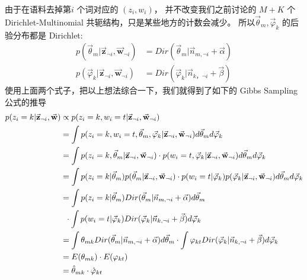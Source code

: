 由于在语料去掉第$i$ 个词对应的 $(z_i, w_i)$，
并不改变我们之前讨论的 $M+K$ 个 Dirichlet-Multinomial 共轭结构，只是某些地方的计数会减少。
所以$\vec{\theta}_m, \vec{\varphi}_k$ 的后验分布都是 Dirichlet:
\begin{align*}
p(\vec{\theta}_m|\vec{\mathbf{z}}_{\neg i}, \vec{\mathbf{w}}_{\neg i})
&= Dir(\vec{\theta}_m| \vec{n}_{m,\neg i} + \vec{\alpha}) \\
p(\vec{\varphi}_k|\vec{\mathbf{z}}_{\neg i}, \vec{\mathbf{w}}_{\neg i})
&=  Dir( \vec{\varphi}_k| \vec{n}_{k，\neg i} + \vec{\beta})
\end{align*}
使用上面两个式子，把以上想法综合一下，我们就得到了如下的 Gibbs Sampling 公式的推导
\begin{align*}
p(z_i = k|\vec{\mathbf{z}}_{\neg i}, \vec{\mathbf{w}}) & \propto
p(z_i = k, w_i = t |\vec{\mathbf{z}}_{\neg i}, \vec{\mathbf{w}}_{\neg i}) \\
&= \int p(z_i = k, w_i = t, \vec{\theta}_m,\vec{\varphi}_k |
   \vec{\mathbf{z}}_{\neg i}, \vec{\mathbf{w}}_{\neg i}) d \vec{\theta}_m d \vec{\varphi}_k \\
&= \int p(z_i = k, \vec{\theta}_m|\vec{\mathbf{z}}_{\neg i}, \vec{\mathbf{w}}_{\neg i})
   \cdot p(w_i = t, \vec{\varphi}_k | \vec{\mathbf{z}}_{\neg i}, \vec{\mathbf{w}}_{\neg i})
   d \vec{\theta}_m d \vec{\varphi}_k   \\
&= \int p(z_i = k |\vec{\theta}_m) p(\vec{\theta}_m|\vec{\mathbf{z}}_{\neg i}, \vec{\mathbf{w}}_{\neg i})
   \cdot p(w_i = t |\vec{\varphi}_k) p(\vec{\varphi}_k|\vec{\mathbf{z}}_{\neg i}, \vec{\mathbf{w}}_{\neg i})
   d \vec{\theta}_m d \vec{\varphi}_k   \\
&= \int p(z_i = k |\vec{\theta}_m) Dir(\vec{\theta}_m| \vec{n}_{m,\neg i} + \vec{\alpha})  d \vec{\theta}_m \\
& \hspace{0.2cm} \cdot \int p(w_i = t |\vec{\varphi}_k) Dir( \vec{\varphi}_k| \vec{n}_{k,\neg i} + \vec{\beta}) d \vec{\varphi}_k \\
&= \int \theta_{mk} Dir(\vec{\theta}_m| \vec{n}_{m,\neg i} + \vec{\alpha})  d \vec{\theta}_m
    \cdot \int \varphi_{kt} Dir( \vec{\varphi}_k| \vec{n}_{k,\neg i} + \vec{\beta})  d \vec{\varphi}_k   \\
&= E(\theta_{mk}) \cdot E(\varphi_{kt}) \\
&= \hat{\theta}_{mk} \cdot \hat{\varphi}_{kt} \\
\label{gibbs-sampling-deduction}
\end{align*}


